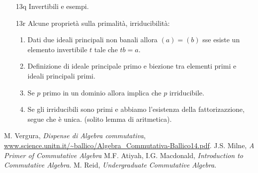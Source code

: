 \documentclass[italian]{article}
\begin{document}
\begin{enumerate}
      \item[13q] Invertibili e esempi.
      \item[13r] Alcune proprietà sulla primalità, irriducibilità: 
        \begin{enumerate}
          \item Dati due ideali principali non banali allora $(a) = (b)$
            sse esiste un elemento invertibile $t$ tale che $tb = a$.
          \item Definizione di ideale principale primo e biezione tra elementi
            primi e ideali principali primi.
          \item Se $p$ primo in un dominio allora implica che $p$
            irriducibile.
          \item Se gli irriducibili sono primi e abbiamo l'esistenza della
            fattorizazzione, segue che è unica. (solito lemma di aritmetica).
        \end{enumerate}
    \end{enumerate}  


    \begin{thebibliography}{9}
       M. Vergura, \textit{Dispense di Algebra commutativa},
        \url{www.science.unitn.it/~ballico/Algebra_Commutativa-Ballico14.pdf}.
       J.S. Milne, \textit{A Primer of Commutative Algebra}
       M.F. Atiyah, I.G. Macdonald, \textit{Introduction to 
            Commutative Algebra}.
       M. Reid, \textit{Undergraduate Commutative Algebra}.
    \end{thebibliography}
\end{document}
